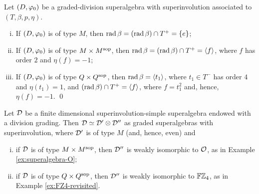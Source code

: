 \begin{lemma}\label{lemma:types-of-D-via-rad-beta}
	Let $(D, \varphi_0)$ be a graded-division superalgebra with superinvolution associated to $(T, \beta, p, \eta)$.
	\begin{enumerate}[(i)]
		\item If $(D, \varphi_0)$ is of type $M$, then $\operatorname{rad} \beta = (\operatorname{rad} \beta) \cap T^+ = \{e\}$;
		\item If $(D, \varphi_0)$ is of type $M\times M^{\mathrm{sop}}$, then $\operatorname{rad} \beta = (\operatorname{rad} \beta) \cap T^+ = \langle f \rangle$, where $f$ has order $2$ and $\eta(f) = -1$;
		\item If $(D, \varphi_0)$ is of type $Q\times Q^{\mathrm{sop}}$, then $\operatorname{rad} \beta = \langle t_1 \rangle$, where $t_1 \in T^-$ has order $4$ and $\eta(t_1) = 1$, and $(\operatorname{rad} \beta) \cap T^+ = \langle f \rangle$, where $f = t_1^2$ and, hence, $\eta(f) = -1$. \qed
	\end{enumerate}
\end{lemma}

\begin{thm}
	Let $\mathcal{D}$ be a finite dimensional superinvolution-simple superalgebra endowed with a division grading.
	Then $\mathcal{D} \simeq \mathcal{D}' \otimes \mathcal{D}''$ as graded superalgebras with superinvolution, where $\mathcal{D}'$ is of type $M$ (and, hence, even) and
	\begin{enumerate}[(i)]
		\item if $\mathcal{D}$ is of type $M\times M^{\mathrm{sop}}$, then $\mathcal{D}''$ is weakly isomorphic to $\mathcal O$, as in Example \ref{ex:superalgebra-O};
		\item if $\mathcal{D}$ is of type $Q\times Q^{\mathrm{sop}}$, then $\mathcal{D}''$ is weakly isomorphic to $\mathbb{F}\mathbb{Z}_4$, as in Example \ref{ex:FZ4-revisited}.
	\end{enumerate}
\end{thm}

